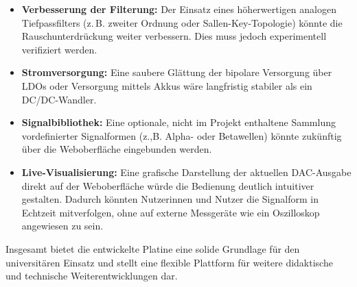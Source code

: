 \begin{itemize}
  \item \textbf{Verbesserung der Filterung:} Der Einsatz eines höherwertigen analogen Tiefpassfilters (z.\,B. zweiter Ordnung oder Sallen-Key-Topologie) könnte die Rauschunterdrückung weiter verbessern. Dies muss jedoch experimentell verifiziert werden.
  \item \textbf{Stromversorgung:} Eine saubere Glättung der bipolare Versorgung über LDOs oder Versorgung mittels Akkus wäre langfristig stabiler als ein DC/DC-Wandler.
  \item \textbf{Signalbibliothek:} Eine optionale, nicht im Projekt enthaltene Sammlung vordefinierter Signalformen (z.,B. Alpha- oder Betawellen) könnte zukünftig über die Weboberfläche eingebunden werden.
  \item \textbf{Live-Visualisierung:} Eine grafische Darstellung der aktuellen DAC-Ausgabe direkt auf der Weboberfläche würde die Bedienung deutlich intuitiver gestalten. Dadurch könnten Nutzerinnen und Nutzer die Signalform in Echtzeit mitverfolgen, ohne auf externe Messgeräte wie ein Oszilloskop angewiesen zu sein.
\end{itemize}

Insgesamt bietet die entwickelte Platine eine solide Grundlage für den universitären Einsatz und stellt eine flexible Plattform für weitere didaktische und technische Weiterentwicklungen dar.
